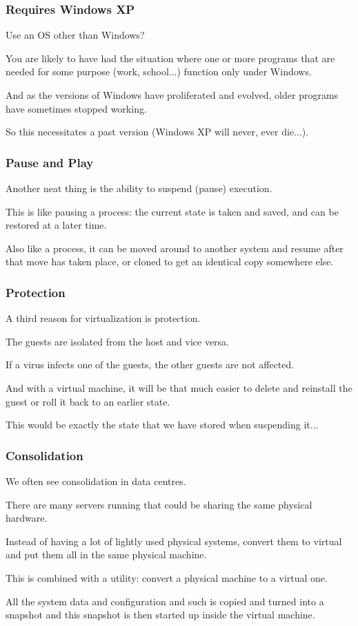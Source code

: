 \begin{frame}
\frametitle{Requires Windows XP}

Use an OS other than Windows? 

You are likely to have had the situation where one or more programs that are needed for some purpose (work, school...) function only under Windows. 

And as the versions of Windows have proliferated and evolved, older programs have sometimes stopped working.

So this necessitates a past version (Windows XP will never, ever die...).

\end{frame}

\begin{frame}
\frametitle{Pause and Play}

Another neat thing is the ability to suspend (pause) execution. 

This is like pausing a process: the current state is taken and saved, and can be restored at a later time. 

Also like a process, it can be moved around to another system and resume after that move has taken place, or cloned to get an identical copy somewhere else.


\end{frame}

\begin{frame}
\frametitle{Protection}

A third reason for virtualization is protection. 

The guests are isolated from the host and vice versa. 

If a virus infects one of the guests, the other guests are not affected. 

And with a virtual machine, it will be that much easier to delete and reinstall the guest or roll it back to an earlier state. 

This would be exactly the state that we have stored when suspending it...


\end{frame}

\begin{frame}
\frametitle{Consolidation}

We often see consolidation in data centres. 

There are many servers running that could be sharing the same physical hardware. 

Instead of having a lot of lightly used physical systems, convert them to virtual and put them all in the same physical machine. 

This is combined with a utility: convert a physical machine to a virtual one.

All the system data and configuration and such is copied and turned into a snapshot and this snapshot is then started up inside the virtual machine.

\end{frame}

